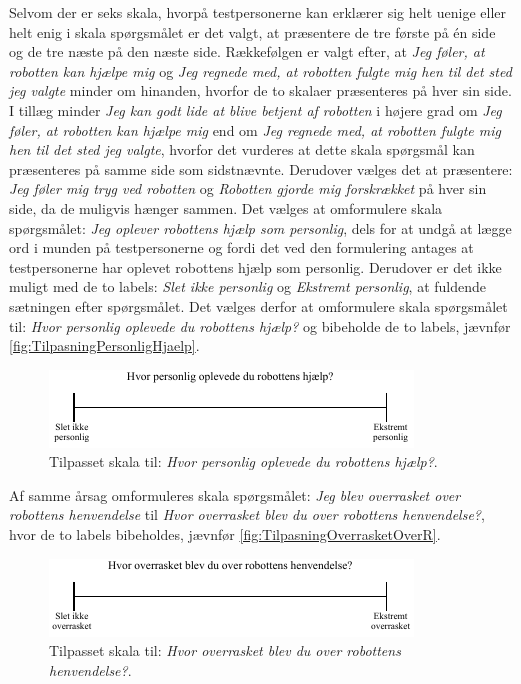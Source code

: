 \noindent
%
Selvom der er seks skala, hvorpå testpersonerne kan erklærer sig helt uenige eller helt enig i skala spørgsmålet er det valgt, at præsentere de tre første på én side og de tre næste på den næste side. Rækkefølgen er valgt efter, at \textit{Jeg føler, at robotten kan hjælpe mig} og \textit{Jeg regnede med, at robotten fulgte mig hen til det sted jeg valgte} minder om hinanden, hvorfor de to skalaer præsenteres på hver sin side. I tillæg minder \textit{Jeg kan godt lide at blive betjent af robotten} i højere grad om \textit{Jeg føler, at robotten kan hjælpe mig} end om \textit{Jeg regnede med, at robotten fulgte mig hen til det sted jeg valgte}, hvorfor det vurderes at dette skala spørgsmål kan præsenteres på samme side som sidstnævnte. Derudover vælges det at præsentere: \textit{Jeg føler mig tryg ved robotten} og \textit{Robotten gjorde mig forskrækket} på hver sin side, da de muligvis hænger sammen. \blankline
%
Det vælges at omformulere skala spørgsmålet: \textit{Jeg oplever robottens hjælp som personlig}, dels for at undgå at lægge ord i munden på testpersonerne og fordi det ved den formulering antages at testpersonerne har oplevet robottens hjælp som personlig. Derudover er det ikke muligt med de to labels: \textit{Slet ikke personlig} og \textit{Ekstremt personlig}, at fuldende sætningen efter spørgsmålet. Det vælges derfor at omformulere skala spørgsmålet til: \textit{Hvor personlig oplevede du robottens hjælp?} og bibeholde de to labels, jævnfør \autoref{fig:TilpasningPersonligHjaelp}. 
%
\begin{figure}[H]
\centering
\includegraphics[width =\textwidth]{Figure/TilpasningAfSkalaer/TilpassetPersonligHjaelp} 
\caption{Tilpasset skala til: \textit{Hvor personlig oplevede du robottens hjælp?}.}
\label{fig:TilpasningPersonligHjaelp}
\end{figure}
\noindent
%
Af samme årsag omformuleres skala spørgsmålet: \textit{Jeg blev overrasket over robottens henvendelse} til \textit{Hvor overrasket blev du over robottens henvendelse?}, hvor de to labels bibeholdes, jævnfør \autoref{fig:TilpasningOverrasketOverR}. 
%
\begin{figure}[H]
\centering
\includegraphics[width =\textwidth]{Figure/TilpasningAfSkalaer/TilpassetOverrasketOverR} 
\caption{Tilpasset skala til: \textit{Hvor overrasket blev du over robottens henvendelse?}.}
\label{fig:TilpasningOverrasketOverR}
\end{figure}
